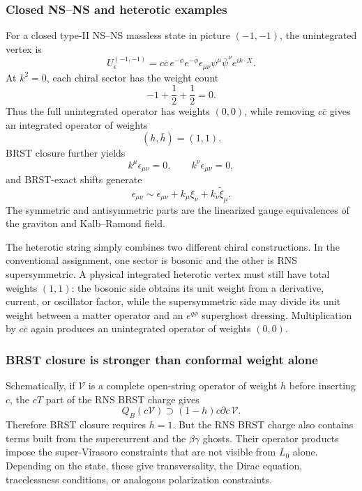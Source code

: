 \documentclass[
  10pt,
  a4paper,
  openany]{book}
\begin{document}
\subsubsection{Closed NS--NS and heterotic
examples}\label{closed-nsns-and-heterotic-examples}

For a closed type-II NS--NS massless state in picture \((-1,-1)\), the
unintegrated vertex is \[
U_\epsilon^{(-1,-1)}
=c\bar c\,e^{-\phi}e^{-\bar\phi}
\epsilon_{\mu\nu}\psi^\mu\bar\psi^\nu e^{ik\cdot X}.
\] At \(k^2=0\), each chiral sector has the weight count \[
-1+\frac12+\frac12=0.
\] Thus the full unintegrated operator has weights \((0,0)\), while
removing \(c\bar c\) gives an integrated operator of weights \[
(h,\bar h)=(1,1).
\] BRST closure further yields \[
k^\mu\epsilon_{\mu\nu}=0,
\qquad
k^\nu\epsilon_{\mu\nu}=0,
\] and BRST-exact shifts generate \[
\epsilon_{\mu\nu}
\sim
\epsilon_{\mu\nu}
+k_\mu\xi_\nu
+k_\nu\widetilde\xi_\mu.
\] The symmetric and antisymmetric parts are the linearized gauge
equivalences of the graviton and Kalb--Ramond field.

The heterotic string simply combines two different chiral constructions.
In the conventional assignment, one sector is bosonic and the other is
RNS supersymmetric. A physical integrated heterotic vertex must still
have total weights \((1,1)\): the bosonic side obtains its unit weight
from a derivative, current, or oscillator factor, while the
supersymmetric side may divide its unit weight between a matter operator
and an \(e^{q\phi}\) superghost dressing. Multiplication by \(c\bar c\)
again produces an unintegrated operator of weights \((0,0)\).

\subsubsection{BRST closure is stronger than conformal weight
alone}\label{brst-closure-is-stronger-than-conformal-weight-alone}

Schematically, if \(\mathcal V\) is a complete open-string operator of
weight \(h\) before inserting \(c\), the \(cT\) part of the RNS BRST
charge gives \[
Q_B(c\mathcal V)
\supset
(1-h)c\partial c\,\mathcal V.
\] Therefore BRST closure requires \(h=1\). But the RNS BRST charge also
contains terms built from the supercurrent and the \(\beta\gamma\)
ghosts. Their operator products impose the super-Virasoro constraints
that are not visible from \(L_0\) alone. Depending on the state, these
give transversality, the Dirac equation, tracelessness conditions, or
analogous polarization constraints.
\end{document}
